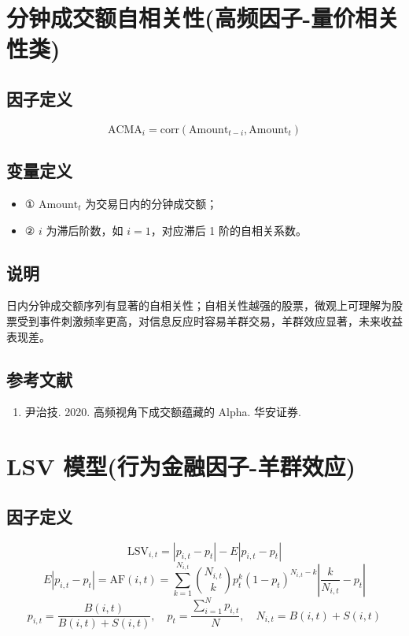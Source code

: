 \documentclass{article}
\begin{document}
\section{分钟成交额自相关性(高频因子-量价相关性类)}

\subsection{因子定义}
\begin{equation}
    \mathrm{ACMA}_i = \mathrm{corr}(\mathrm{Amount}_{t-i}, \mathrm{Amount}_t)
\end{equation}

\subsection{变量定义}
\begin{itemize}
    \item ① \( \mathrm{Amount}_t \) 为交易日内的分钟成交额；
    \item ② \( i \) 为滞后阶数，如 \( i=1 \)，对应滞后 1 阶的自相关系数。
\end{itemize}

\subsection{说明}
日内分钟成交额序列有显著的自相关性；自相关性越强的股票，微观上可理解为股票受到事件刺激频率更高，对信息反应时容易羊群交易，羊群效应显著，未来收益表现差。

\subsection{参考文献}
\begin{enumerate}
    \item 尹治技. 2020. 高频视角下成交额蕴藏的 Alpha. 华安证券.
\end{enumerate}

\section{LSV 模型(行为金融因子-羊群效应)}

\subsection{因子定义}
\begin{equation}
    \mathrm{LSV}_{i,t} = |p_{i,t} - p_t| - E|p_{i,t} - p_t|
\end{equation}
\begin{equation}
    E|p_{i,t} - p_t| = \mathrm{AF}(i,t) = \sum_{k=1}^{N_{i,t}} \binom{N_{i,t}}{k} p_t^k (1 - p_t)^{N_{i,t} - k} \left| \frac{k}{N_{i,t}} - p_t \right|
\end{equation}
\begin{equation}
    p_{i,t} = \frac{B(i,t)}{B(i,t) + S(i,t)}, \quad p_t = \frac{\sum_{i=1}^N p_{i,t}}{N}, \quad N_{i,t} = B(i,t) + S(i,t)
\end{equation}
\end{document}
